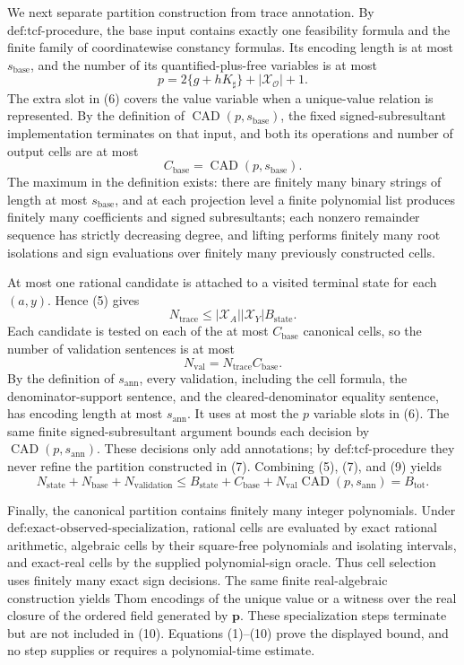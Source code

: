 We next separate partition construction from trace annotation. By \(\text{def:tcf-procedure}\), the base input contains exactly one feasibility formula and the finite family of coordinatewise constancy formulas. Its encoding length is at most \(s_{\mathrm{base}}\), and the number of its quantified-plus-free variables is at most
\[
p=2\{g+hK_{\sharp}\}+|\mathcal X_{\mathcal O}|+1.
\tag{6}
\]
The extra slot in (6) covers the value variable when a unique-value relation is represented. By the definition of \(\operatorname{CAD}(p,s_{\mathrm{base}})\), the fixed signed-subresultant implementation terminates on that input, and both its operations and number of output cells are at most
\[
C_{\mathrm{base}}=\operatorname{CAD}(p,s_{\mathrm{base}}).
\tag{7}
\]
The maximum in the definition exists: there are finitely many binary strings of length at most \(s_{\mathrm{base}}\), and at each projection level a finite polynomial list produces finitely many coefficients and signed subresultants; each nonzero remainder sequence has strictly decreasing degree, and lifting performs finitely many root isolations and sign evaluations over finitely many previously constructed cells.

At most one rational candidate is attached to a visited terminal state for each \((a,y)\). Hence (5) gives
\[
N_{\mathrm{trace}}
\leq|\mathcal X_A||\mathcal X_Y|B_{\mathrm{state}}.
\tag{8}
\]
Each candidate is tested on each of the at most \(C_{\mathrm{base}}\) canonical cells, so the number of validation sentences is at most
\[
N_{\mathrm{val}}=N_{\mathrm{trace}}C_{\mathrm{base}}.
\tag{9}
\]
By the definition of \(s_{\mathrm{ann}}\), every validation, including the cell formula, the denominator-support sentence, and the cleared-denominator equality sentence, has encoding length at most \(s_{\mathrm{ann}}\). It uses at most the \(p\) variable slots in (6). The same finite signed-subresultant argument bounds each decision by \(\operatorname{CAD}(p,s_{\mathrm{ann}})\). These decisions only add annotations; by \(\text{def:tcf-procedure}\) they never refine the partition constructed in (7). Combining (5), (7), and (9) yields
\[
N_{\mathrm{state}}+N_{\mathrm{base}}+N_{\mathrm{validation}}
\leq
B_{\mathrm{state}}+C_{\mathrm{base}}
+N_{\mathrm{val}}\operatorname{CAD}(p,s_{\mathrm{ann}})
=B_{\mathrm{tot}}.
\tag{10}
\]

Finally, the canonical partition contains finitely many integer polynomials. Under \(\text{def:exact-observed-specialization}\), rational cells are evaluated by exact rational arithmetic, algebraic cells by their square-free polynomials and isolating intervals, and exact-real cells by the supplied polynomial-sign oracle. Thus cell selection uses finitely many exact sign decisions. The same finite real-algebraic construction yields Thom encodings of the unique value or a witness over the real closure of the ordered field generated by \(\mathbf p\). These specialization steps terminate but are not included in (10). Equations (1)--(10) prove the displayed bound, and no step supplies or requires a polynomial-time estimate.